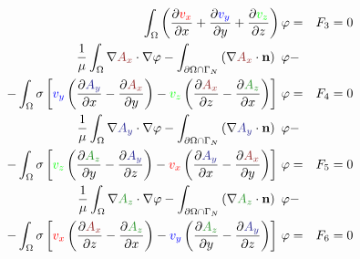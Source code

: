 \documentclass[smallextended]{svjour3}       %
\begin{document}
\begin{eqnarray}
			\int_{\Omega} \left(\frac{\partial \textcolor{red}{v_x}}{\partial x} + \frac{\partial \textcolor{blu}{v_y}}{\partial y} + \frac{\partial \textcolor{gre}{v_z}}{\partial z}\right) \varphi & = & F_3 = 0 \\
			\frac{1}{\mu}\int_{\Omega}\nabla \textcolor{darkred}{A_x} \cdot \nabla \varphi - \int_{\partial \Omega \cap \Gamma_{N}} \left(\nabla \textcolor{darkred}{A_x}\cdot \mathbf{n}\right)\ \varphi 
			 \nonumber& - \\
			-  \int_{\Omega} \sigma \left[\textcolor{blu}{v_y} \left(\frac{\partial \textcolor{darkblu}{A_y}}{\partial x} - \frac{\partial \textcolor{darkred}{A_x}}{\partial y}\right) - \textcolor{gre}{v_z} \left(\frac{\partial \textcolor{darkred}{A_x}}{\partial z} - \frac{\partial \textcolor{darkgre}{A_z}}{\partial x}\right)\right]\,\varphi & = & F_4 = 0 \\			
			\frac{1}{\mu}\int_{\Omega}\nabla \textcolor{darkblu}{A_y} \cdot \nabla \varphi - \int_{\partial \Omega \cap \Gamma_{N}} \left(\nabla \textcolor{darkblu}{A_y}\cdot \mathbf{n}\right)\ \varphi 
			 \nonumber& - \\
			- \int_{\Omega} \sigma \left[\textcolor{gre}{v_z} \left(\frac{\partial \textcolor{darkgre}{A_z}}{\partial y} - \frac{\partial \textcolor{darkblu}{A_y}}{\partial z}\right) - \textcolor{red}{v_x} \left(\frac{\partial \textcolor{darkblu}{A_y}}{\partial x} - \frac{\partial \textcolor{darkred}{A_x}}{\partial y}\right)\right]\,\varphi & = & F_5 = 0 \\			
			\frac{1}{\mu}\int_{\Omega}\nabla \textcolor{darkgre}{A_z} \cdot \nabla \varphi - \int_{\partial \Omega \cap \Gamma_{N}} \left(\nabla \textcolor{darkgre}{A_z}\cdot \mathbf{n}\right)\ \varphi 
			 \nonumber& - \\
			-  \int_{\Omega} \sigma \left[\textcolor{red}{v_x} \left(\frac{\partial \textcolor{darkred}{A_x}}{\partial z} - \frac{\partial \textcolor{darkgre}{A_z}}{\partial x}\right) - \textcolor{blu}{v_y} \left(\frac{\partial \textcolor{darkgre}{A_z}}{\partial y} - \frac{\partial \textcolor{darkblu}{A_y}}{\partial z}\right)\right]\,\varphi & = & F_6 = 0 \\
			 \nonumber 
		\end{eqnarray}
		
\end{document}
